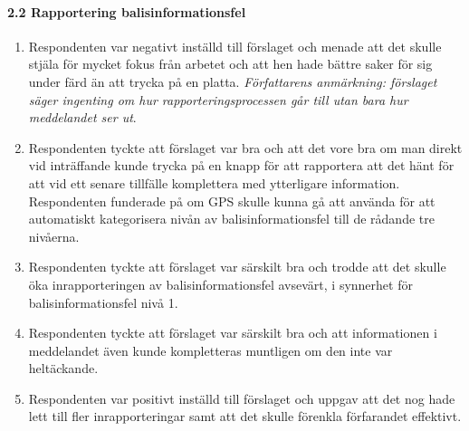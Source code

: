 \paragraph{2.2 Rapportering balisinformationsfel}
\begin{enumerate}
    \item Respondenten var negativt inställd till förslaget och menade att det skulle stjäla för mycket fokus från arbetet och att hen hade bättre saker för sig under färd än att trycka på en platta.
    \vspace{10pt}
    \emph{Författarens anmärkning: förslaget säger ingenting om hur rapporteringsprocessen går till utan bara hur meddelandet ser ut}.
    \item Respondenten tyckte att förslaget var bra och att det vore bra om man direkt vid inträffande kunde trycka på en knapp för att rapportera att det hänt för att vid ett senare tillfälle komplettera med ytterligare information.
    Respondenten funderade på om GPS skulle kunna gå att använda för att automatiskt kategorisera nivån av balisinformationsfel till de rådande tre nivåerna.
    \item Respondenten tyckte att förslaget var särskilt bra och trodde att det skulle öka inrapporteringen av balisinformationsfel avsevärt, i synnerhet för balisinformationsfel nivå 1.
    \item Respondenten tyckte att förslaget var särskilt bra och att informationen i meddelandet även kunde kompletteras muntligen om den inte var heltäckande.
    \item Respondenten var positivt inställd till förslaget och uppgav att det nog hade lett till fler inrapporteringar samt att det skulle förenkla förfarandet effektivt.
\end{enumerate}
\hspace{-12pt}
